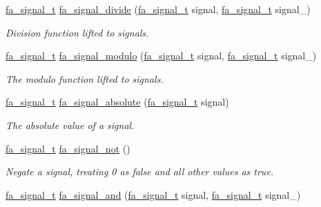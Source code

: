 \begin{DoxyCompactItemize}
\hyperlink{group___fa_signal_gac5c72f160cd6e93a6783551627b166e5}{fa\-\_\-signal\-\_\-t} \hyperlink{group___fa_signal_gaf04f0c050d830247a969fc684d6cfa79}{fa\-\_\-signal\-\_\-divide} (\hyperlink{group___fa_signal_gac5c72f160cd6e93a6783551627b166e5}{fa\-\_\-signal\-\_\-t} signal, \hyperlink{group___fa_signal_gac5c72f160cd6e93a6783551627b166e5}{fa\-\_\-signal\-\_\-t} signal\-\_\-)
\begin{DoxyCompactList}\small\item\em Division function lifted to signals. \end{DoxyCompactList}\item 
\hyperlink{group___fa_signal_gac5c72f160cd6e93a6783551627b166e5}{fa\-\_\-signal\-\_\-t} \hyperlink{group___fa_signal_ga3332e2294e3f33ebaf915b642bba7cf3}{fa\-\_\-signal\-\_\-modulo} (\hyperlink{group___fa_signal_gac5c72f160cd6e93a6783551627b166e5}{fa\-\_\-signal\-\_\-t} signal, \hyperlink{group___fa_signal_gac5c72f160cd6e93a6783551627b166e5}{fa\-\_\-signal\-\_\-t} signal\-\_\-)
\begin{DoxyCompactList}\small\item\em The modulo function lifted to signals. \end{DoxyCompactList}\item 
\hyperlink{group___fa_signal_gac5c72f160cd6e93a6783551627b166e5}{fa\-\_\-signal\-\_\-t} \hyperlink{group___fa_signal_gae314695a4f6bdec58ab562121889eef9}{fa\-\_\-signal\-\_\-absolute} (\hyperlink{group___fa_signal_gac5c72f160cd6e93a6783551627b166e5}{fa\-\_\-signal\-\_\-t} signal)
\begin{DoxyCompactList}\small\item\em The absolute value of a signal. \end{DoxyCompactList}\item 
\hyperlink{group___fa_signal_gac5c72f160cd6e93a6783551627b166e5}{fa\-\_\-signal\-\_\-t} \hyperlink{group___fa_signal_ga2e6e7dbd87e285c59f8c64338d3b61a3}{fa\-\_\-signal\-\_\-not} ()
\begin{DoxyCompactList}\small\item\em Negate a signal, treating 0 as false and all other values as true. \end{DoxyCompactList}\item 
\hyperlink{group___fa_signal_gac5c72f160cd6e93a6783551627b166e5}{fa\-\_\-signal\-\_\-t} \hyperlink{group___fa_signal_gaafa65b46dda9e6eca339523019af7390}{fa\-\_\-signal\-\_\-and} (\hyperlink{group___fa_signal_gac5c72f160cd6e93a6783551627b166e5}{fa\-\_\-signal\-\_\-t} signal, \hyperlink{group___fa_signal_gac5c72f160cd6e93a6783551627b166e5}{fa\-\_\-signal\-\_\-t} signal\-\_\-)

\end{DoxyCompactItemize}

